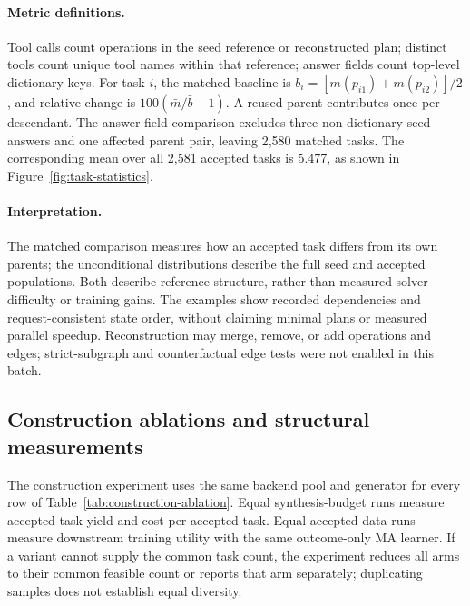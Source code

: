 \paragraph{Metric definitions.}
Tool calls count operations in the seed reference or reconstructed plan; distinct tools count unique tool names within that reference; answer fields count top-level dictionary keys. For task $i$, the matched baseline is $b_i=[m(p_{i1})+m(p_{i2})]/2$, and relative change is $100(\bar m/\bar b-1)$. A reused parent contributes once per descendant. The answer-field comparison excludes three non-dictionary seed answers and one affected parent pair, leaving 2,580 matched tasks. The corresponding mean over all 2,581 accepted tasks is 5.477, as shown in Figure~\ref{fig:task-statistics}.

\paragraph{Interpretation.}
The matched comparison measures how an accepted task differs from its own parents; the unconditional distributions describe the full seed and accepted populations. Both describe reference structure, rather than measured solver difficulty or training gains. The examples show recorded dependencies and request-consistent state order, without claiming minimal plans or measured parallel speedup. Reconstruction may merge, remove, or add operations and edges; strict-subgraph and counterfactual edge tests were not enabled in this batch.

\subsection{Construction ablations and structural measurements}

The construction experiment uses the same backend pool and generator for every row of Table~\ref{tab:construction-ablation}. Equal synthesis-budget runs measure accepted-task yield and cost per accepted task. Equal accepted-data runs measure downstream training utility with the same outcome-only MA learner. If a variant cannot supply the common task count, the experiment reduces all arms to their common feasible count or reports that arm separately; duplicating samples does not establish equal diversity.

